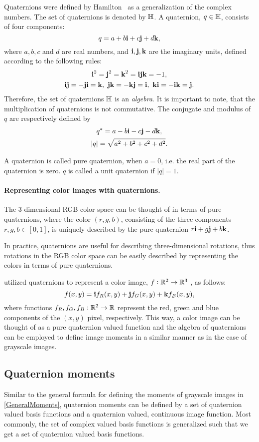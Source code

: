 Quaternions were defined by Hamilton~\cite{Hamilton} as a generalization of the complex numbers. The set of quaternions is denoted by $\mathbb{H}$. A quaternion, $q \in \mathbb{H}$, consists of four components:
\[
	q = a+b\textbf{i} +c\textbf{j}+d\textbf{k},
\]
where $a,b,c$ and $d$ are real numbers, and $\textbf{i},\textbf{j},\textbf{k}$ are the imaginary units, defined according to the following rules:
\[
\begin{gathered}
	\textbf{i}^2 = \textbf{j}^2 = \textbf{k}^2 = \textbf{i}\textbf{j}\textbf{k} = -1,\\
	\textbf{i}\textbf{j} = -\textbf{j}\textbf{i} = \textbf{k},\ \textbf{j}\textbf{k} = -\textbf{k}\textbf{j} = \textbf{i},\ \textbf{k}\textbf{i} = -\textbf{i}\textbf{k} = \textbf{j}.
\end{gathered}
\]
Therefore, the set of quaternions $\mathbb{H}$ is an \textit{algebra}. It is important to note, that the multiplication of quaternions is not commutative. The conjugate and modulus of $q$ are respectively defined by
\[
\begin{gathered}
q^* = a-b\textbf{i}-c\textbf{j}-d\textbf{k}, \\
|q| = \sqrt{a^2+b^2+c^2+d^2}.
\end{gathered}
\]

A quaternion is called pure quaternion, when $a = 0$, i.e. the real part of the quaternion is zero. $q$ is called a unit quaternion if $|q| = 1$.

\paragraph{Representing color images with quaternions.}
The 3-dimensional RGB color space can be thought of in terms of pure quaternions, where the color $(r,g,b)$, consisting of the three components $r,g,b \in [0,1]$, is uniquely described by the pure quaternion $r\textbf{i} + g\textbf{j} + b\textbf{k}$.


In practice, quaternions are useful for describing three-dimensional rotations, thus rotations in the RGB color space can be easily described by representing the colors in terms of pure quaternions.


\citeauthor{EllSangwine} \cite{EllSangwine} utilized quaternions to represent a color image, $f: \mathbb{R}^2\to\mathbb{R}^3$ , as follows:
\[
f(x,y) = \textbf{i} f_R(x,y) + \textbf{j} f_G(x,y) + \textbf{k} f_B(x,y),
\]
where functions $f_R , f_G, f_B:\mathbb{R}^2\to\mathbb{R}$ represent the red, green and blue components of the $(x,y)$ pixel, respectively. This way, a color image can be thought of as a pure quaternion valued function and the algebra of quaternions can be employed to define image moments in a similar manner as in the case of grayscale images.

\subsection{Quaternion moments}
Similar to the general formula for defining the moments of grayscale images in \eqref{GeneralMoments}, quaternion moments can be defined by a set of quaternion valued basis functions and a quaternion valued, continuous image function. Most commonly, the set of complex valued basis functions is generalized such that we get a set of quaternion valued basis functions.

